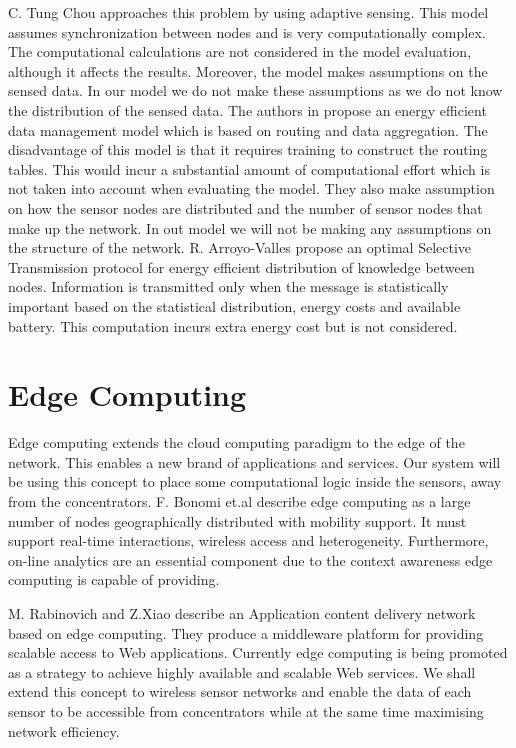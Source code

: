 \documentclass{mproj}
\begin{document}
C. Tung Chou \cite{informationCollection} approaches this problem by using adaptive sensing. This model assumes synchronization between nodes and is very computationally complex. The computational calculations are not considered in the model evaluation, although it affects the results. Moreover, the model makes assumptions on the sensed data. In our model we do not make these assumptions as we do not know the distribution of the sensed data. The authors in \cite{energyEfficientDataManagement} propose an energy efficient data management model which is based on routing and data aggregation. The disadvantage of this model is that it requires training to construct the routing tables. This would incur a substantial amount of computational effort which is not taken into account when evaluating the model. They also make assumption on how the sensor nodes are distributed and the number of sensor nodes that make up the network. In out model we will not be making any assumptions on the structure of the network. R. Arroyo-Valles \cite{optimalSelective} propose an optimal Selective Transmission protocol for energy efficient distribution of knowledge between nodes. Information is transmitted only when the message is statistically important based on the statistical distribution, energy costs and available battery. This computation incurs extra energy cost but is not considered.

\section{Edge Computing}
Edge computing extends the cloud computing paradigm to the edge of the network. This enables a new brand of applications and services. Our system will be using this concept to place some computational logic inside the sensors, away from the concentrators. F. Bonomi et.al \cite{fogComputing} describe edge computing as a large number of nodes geographically distributed with mobility support. It must support real-time interactions, wireless access and heterogeneity. Furthermore, on-line analytics are an essential component due to the context awareness edge computing is capable of providing. 

M. Rabinovich and Z.Xiao \cite{replicatingInternetApplications} describe an Application content delivery network based on edge computing. They produce a middleware platform for providing scalable access to Web applications. Currently edge computing is being promoted as a strategy to achieve highly available and scalable Web services. \cite{authenticatingQueries} We shall extend this concept to wireless sensor networks and enable the data of each sensor to be accessible from concentrators while at the same time maximising network efficiency.
\end{document}
